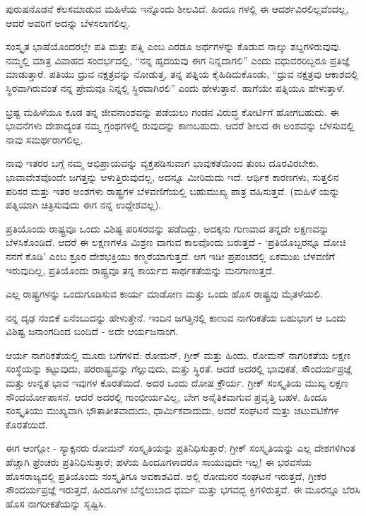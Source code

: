 ಪುರುಷನೊಡನೆ ಕೆಲಸಮಾಡುವ ಮಹಿಳೆಯ ಇನ್ನೊಂದು ಶೀಲವಿದೆ. ಹಿಂದೂ ಗಳಲ್ಲಿ ಈ ಆದರ್ಶವಿರಲಿಲ್ಲವೆಂದಲ್ಲ, ಆದರೆ ಅವರಿಗೆ ಅದನ್ನು ಬೆಳಸಲಾಗಲಿಲ್ಲ.

ಸಂಸ್ಕೃತ ಭಾಷೆಯೊಂದರಲ್ಲೇ ಪತಿ ಮತ್ತು ಪತ್ನಿ ಎಂಬ ಎರಡೂ ಅರ್ಥಗಳನ್ನು ಕೊಡುವ ನಾಲ್ಕು ಶಬ್ದಗಳಿರುವುವು. ನಮ್ಮಲ್ಲಿ ಮಾತ್ರ ವಿವಾಹದ ಸಂದರ್ಭದಲ್ಲಿ, “ನನ್ನ ಹೃದಯವು ಈಗ ನಿನ್ನದಾಗಲಿ” ಎಂದು ವಧುವರರಿಬ್ಬರೂ ಪ್ರತಿಜ್ಞೆ ಮಾಡುತ್ತಾರೆ. ಪತಿಯು ಧ್ರುವ ನಕ್ಷತ್ರವನ್ನು ನೋಡುತ್ತ, ತನ್ನ ಪತ್ನಿಯ ಕೈಹಿಡಿದುಕೊಂಡು, “ಧ್ರುವ ನಕ್ಷತ್ರವು ಆಕಾಶದಲ್ಲಿ ಸ್ಥಿರವಾಗಿರುವಂತೆ ನನ್ನ ಪ್ರೇಮವೂ ನಿನ್ನಲ್ಲಿ ಸ್ಥಿರವಾಗಿರಲಿ” ಎಂದು ಹೇಳುತ್ತಾನೆ. ಹಾಗೆಯೇ ಪತ್ನಿಯೂ ಹೇಳುತ್ತಾಳೆ.

ಭ್ರಷ್ಟ ಮಹಿಳೆಯೂ ಕೂಡ ತನ್ನ ಜೀವನಾಂಶವನ್ನು ಪಡೆಯಲು ಗಂಡನ ವಿರುದ್ಧ ಕೋರ್ಟಿಗೆ ಹೋಗಬಹುದು. ಈ ಭಾವನೆಗಳು ದೇಶಾದ್ಯಂತ ನಮ್ಮ ಗ್ರಂಥಗಳಲ್ಲಿ ರುವುದನ್ನು ಕಾಣಬಹುದು. ಆದರೆ ಶೀಲದ ಈ ಅಂಶವನ್ನು ಬೆಳಸುವಲ್ಲಿ ನಾವು ಸಮರ್ಥರಾಗಲಿಲ್ಲ.

ನಾವು ಇತರರ ಬಗ್ಗೆ ನಮ್ಮ ಅಭಿಪ್ರಾಯವನ್ನು ವ್ಯಕ್ತಪಡಿಸುವಾಗ ಭಾವುಕತೆಯಿಂದ ತುಂಬ ದೂರವಿರಬೇಕು. ಭಾವಾವೇಶವೊಂದೇ ಜಗತ್ತನ್ನು ಆಳುತ್ತಿರುವುದಲ್ಲ, ಅದನ್ನೂ ಮೀರಿದುದು ಇದೆ. ಆರ್ಥಿಕ ಕಾರಣಗಳು, ಸುತ್ತಲಿನ ಪರಿಸರ ಮತ್ತು ಇತರ ಅಂಶಗಳು ರಾಷ್ಟ್ರಗಳ ಬೆಳವಣಿಗೆಯಲ್ಲಿ ಬಹುಮುಖ್ಯ ಪಾತ್ರ ವಹಿಸುತ್ತವೆ. (ಮಹಿಳೆ ಯನ್ನು ಪತ್ನಿಯಾಗಿ ಚಿತ್ರಿಸುವುದು ಈಗ ನನ್ನ ಉದ್ದೇಶವಲ್ಲ).

ಪ್ರತಿಯೊಂದು ರಾಷ್ಟ್ರವೂ ಒಂದು ವಿಶಿಷ್ಟ ಪರಿಸರವನ್ನು ಪಡೆದಿದ್ದು, ಅದಕ್ಕನು ಗುಣವಾದ ತನ್ನದೇ ಲಕ್ಷಣವನ್ನು ಬೆಳಸಿಕೊಂಡಿದೆ. ಆದರೆ ಈ ಲಕ್ಷಣಗಳೂ ಮಿಶ್ರಣ ವಾಗುವ ಕಾಲವೊಂದು ಬರುತ್ತದೆ - ‘ಪ್ರತಿಯೊಬ್ಬರನ್ನೂ ದೋಚಿ ನನಗೆ ಕೊಡಿ’ ಎಂಬ ಕ್ರೂರ ದೇಶಭಕ್ತಿಯು ಕಣ್ಮರೆಯಾಗುತ್ತದೆ. ಆಗ ಇಡೀ ಪ್ರಪಂಚದಲ್ಲಿ ಏಕಮುಖ ಬೆಳವಣಿಗೆ ಇರುವುದಿಲ್ಲ, ಪ್ರತಿಯೊಂದು ರಾಷ್ಟ್ರವೂ ತನ್ನ ಕಾರ್ಯದ ಸಾರ್ಥಕತೆಯನ್ನು ಮನಗಾಣುತ್ತದೆ.

ಎಲ್ಲ ರಾಷ್ಟ್ರಗಳನ್ನು ಒಂದುಗೂಡಿಸುವ ಕಾರ್ಯ ಮಾಡೋಣ ಮತ್ತು ಒಂದು ಹೊಸ ರಾಷ್ಟ್ರವು ಮೈತಳೆಯಲಿ.

ನನ್ನ ದೃಢ ನಂಬಿಕೆ ಏನೆಂಬುದನ್ನು ಹೇಳುತ್ತೇನೆ. ಇಂದಿನ ಜಗತ್ತಿನಲ್ಲಿ ಕಾಣುವ ನಾಗರಿಕತೆಯ ಬಹುಭಾಗ ಆ ಒಂದು ವಿಶಿಷ್ಟ ಜನಾಂಗದಿಂದ ಬಂದಿದೆ - ಅದೇ ಆರ್ಯಜನಾಂಗ.

ಆರ್ಯ ನಾಗರಿಕತೆಯಲ್ಲಿ ಮೂರು ಬಗೆಗಳಿವೆ: ರೋಮನ್, ಗ್ರೀಕ್ ಮತ್ತು ಹಿಂದು. ರೋಮನ್ ನಾಗರಿಕತೆಯ ಲಕ್ಷಣ ಸಂಸ್ಥೆಯನ್ನು ಕಟ್ಟುವುದು, ಪರರಾಷ್ಟ್ರವನ್ನು ಗೆಲ್ಲುವುದು, ಮತ್ತು ಸ್ಥಿರತೆ. ಆದರೆ ಅದರಲ್ಲಿ ಭಾವುಕತೆ, ಸೌಂದರ್ಯಪ್ರಜ್ಞೆ ಮತ್ತು ಉನ್ನತ ಭಾವ ಇವುಗಳ ಕೊರತೆಯಿದೆ. ಅದರ ಒಂದು ದೋಷ ಕ್ರೌರ್ಯ. ಗ್ರೀಕ್ ಸಂಸ್ಕೃತಿಯ ಮುಖ್ಯ ಲಕ್ಷಣ ಸೌಂದರ್ಯೋಪಾಸನೆ. ಆದರೆ ಅದರಲ್ಲಿ ಗಾಂಭೀರ್ಯವಿಲ್ಲ, ಬೇಗ ಅನೈತಿಕವಾಗುವ ಪ್ರವೃತ್ತಿ ಬಹಳ. ಹಿಂದೂ ಸಂಸ್ಕೃತಿಯು ಮುಖ್ಯವಾಗಿ ಭೌತಾತೀತವಾದುದು, ಧಾರ್ಮಿಕವಾದುದು, ಆದರೆ ಸಂಘಟನೆ ಮತ್ತು ಚಟುವಟಿಕೆಗಳ ಕೊರತೆಯಿದೆ.

ಈಗ ಆಂಗ್ಲೋ - ಸ್ಯಾಕ್ಸನರು ರೋಮನ್ ಸಂಸ್ಕೃತಿಯನ್ನು ಪ್ರತಿನಿಧಿಸುತ್ತಾರೆ; ಗ್ರೀಕ್ ಸಂಸ್ಕೃತಿಯನ್ನು ಎಲ್ಲ ದೇಶಗಳಿಗಿಂತ ಹೆಚ್ಚಾಗಿ ಫ್ರೆಂಚರು ಪ್ರತಿನಿಧಿಸುತ್ತಾರೆ; ಹಳೆಯ ಹಿಂದೂಗಳಾದರೊ ಸಾಯುವುದೇ ಇಲ್ಲ! ಈ ಭರವಸೆಯ ಹೊಸರಾಜ್ಯದಲ್ಲಿ ಪ್ರತಿಯೊಂದು ಸಂಸ್ಕೃತಿಗೂ ಅವಕಾಶವಿದೆ. ಅಲ್ಲಿ ರೋಮನರ ಸಂಘಟನೆ ಇರುತ್ತದೆ, ಗ್ರೀಕರ ಸೌಂದರ್ಯಪ್ರಜ್ಞೆ ಇರುತ್ತದೆ, ಹಿಂದೂಗಳ ಬೆನ್ನೆಲುಬಾದ ಧರ್ಮ ಮತ್ತು ಭಗವದ್ಭ ಕ್ತಿಗಳಿರುತ್ತವೆ. ಈ ಮೂರನ್ನೂ ಬೆರಸಿ ಹೊಸ ನಾಗರೀಕತೆಯನ್ನು ಸೃಷ್ಟಿಸಿ.

